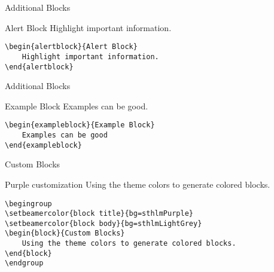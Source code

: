 \documentclass[compress]{beamer}
\begin{document}

\begin{frame}[containsverbatim]{Additional Blocks}
\begin{alertblock}{Alert Block}
	Highlight important information.
\end{alertblock}
\begin{lstlisting}
\begin{alertblock}{Alert Block}
	Highlight important information.
\end{alertblock}
\end{lstlisting}

\end{frame}


\begin{frame}[containsverbatim]{Additional Blocks}

\begin{exampleblock}{Example Block}
	Examples can be good.
\end{exampleblock}
\begin{lstlisting}
\begin{exampleblock}{Example Block}
	Examples can be good
\end{exampleblock}
\end{lstlisting}
\end{frame}


\begin{frame}[containsverbatim]{Custom Blocks}
\begingroup
{}
\begin{block}{Purple customization}
	Using the theme colors to generate colored blocks.
\end{block}
\endgroup
\begin{lstlisting}
\begingroup
\setbeamercolor{block title}{bg=sthlmPurple}
\setbeamercolor{block body}{bg=sthlmLightGrey}
\begin{block}{Custom Blocks}
	Using the theme colors to generate colored blocks.
\end{block}
\endgroup
\end{lstlisting}
\end{frame}
\end{document}
